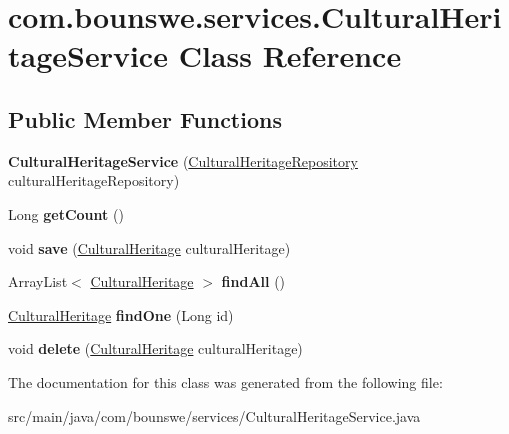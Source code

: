 \hypertarget{classcom_1_1bounswe_1_1services_1_1_cultural_heritage_service}{}\section{com.\+bounswe.\+services.\+Cultural\+Heritage\+Service Class Reference}
\label{classcom_1_1bounswe_1_1services_1_1_cultural_heritage_service}
\subsection*{Public Member Functions}
\begin{DoxyCompactItemize}
\item 
\mbox{\label{classcom_1_1bounswe_1_1services_1_1_cultural_heritage_service_ad77c0b61078a9876dfc71555c56470c6}} 
{\bfseries Cultural\+Heritage\+Service} (\hyperlink{interfacecom_1_1bounswe_1_1repository_1_1_cultural_heritage_repository}{Cultural\+Heritage\+Repository} cultural\+Heritage\+Repository)
\item 
\mbox{\label{classcom_1_1bounswe_1_1services_1_1_cultural_heritage_service_a0d1ef808dfb1d22c51779231d3d4584a}} 
Long {\bfseries get\+Count} ()
\item 
\mbox{\label{classcom_1_1bounswe_1_1services_1_1_cultural_heritage_service_a4aa90bd1c9843535ccb568666f5b917c}} 
void {\bfseries save} (\hyperlink{classcom_1_1bounswe_1_1models_1_1_cultural_heritage}{Cultural\+Heritage} cultural\+Heritage)
\item 
\mbox{\label{classcom_1_1bounswe_1_1services_1_1_cultural_heritage_service_aee2af74cfd889705e38c4efbecfead48}} 
Array\+List$<$ \hyperlink{classcom_1_1bounswe_1_1models_1_1_cultural_heritage}{Cultural\+Heritage} $>$ {\bfseries find\+All} ()
\item 
\mbox{\label{classcom_1_1bounswe_1_1services_1_1_cultural_heritage_service_a221d8db44b3d995ded3362848d8a19ec}} 
\hyperlink{classcom_1_1bounswe_1_1models_1_1_cultural_heritage}{Cultural\+Heritage} {\bfseries find\+One} (Long id)
\item 
\mbox{\label{classcom_1_1bounswe_1_1services_1_1_cultural_heritage_service_a5697a11cffb74bc7843ec4882711866a}} 
void {\bfseries delete} (\hyperlink{classcom_1_1bounswe_1_1models_1_1_cultural_heritage}{Cultural\+Heritage} cultural\+Heritage)
\end{DoxyCompactItemize}


The documentation for this class was generated from the following file\+:\begin{DoxyCompactItemize}
\item 
src/main/java/com/bounswe/services/Cultural\+Heritage\+Service.\+java\end{DoxyCompactItemize}
